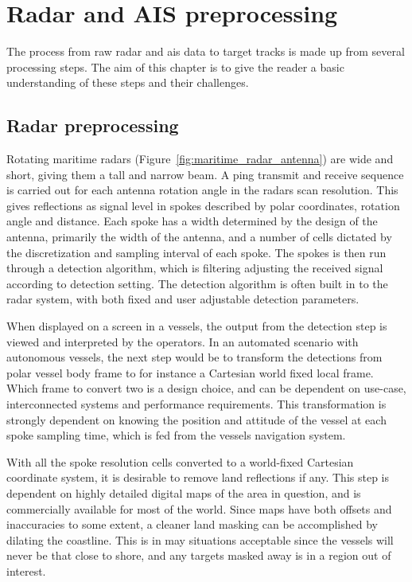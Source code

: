 
\chapter{Radar and AIS preprocessing}\label{chapter:radar-and-ais-preprocessing}
The process from raw radar and \gls{ais} data to target tracks is made up from several processing steps. The aim of this chapter is to give the reader a basic understanding of these steps and their challenges.

\section{Radar preprocessing}\label{sec:radar_preprocessing}
Rotating maritime radars (Figure~\ref{fig:maritime_radar_antenna}) are wide and short, giving them a tall and narrow beam. A ping transmit and receive sequence is carried out for each antenna rotation angle in the radars scan resolution. This gives reflections as signal level in spokes described by polar coordinates, rotation angle and distance. Each spoke has a width determined by the design of the antenna, primarily the width of the antenna, and a number of cells dictated by the discretization and sampling interval of each spoke. The spokes is then run through a detection algorithm, which is filtering adjusting the received signal according to detection setting. The detection algorithm is often built in to the radar system, with both fixed and user adjustable detection parameters.

When displayed on a screen in a vessels, the output from the detection step is viewed and interpreted by the operators. In an automated scenario with autonomous vessels, the next step would be to transform the detections from polar vessel body frame to for instance a Cartesian world fixed local frame. Which frame to convert two is a design choice, and can be dependent on use-case, interconnected systems and performance requirements. This transformation is strongly dependent on knowing the position and attitude of the vessel at each spoke sampling time, which is fed from the vessels navigation system.

With all the spoke resolution cells converted to a world-fixed Cartesian coordinate system, it is desirable to remove land reflections if any. This step is dependent on highly detailed digital maps of the area in question, and is commercially available for most of the world. Since maps have both offsets and inaccuracies to some extent, a cleaner land masking can be accomplished by dilating the coastline. This is in may situations acceptable since the vessels will never be that close to shore, and any targets masked away is in a region out of interest.

